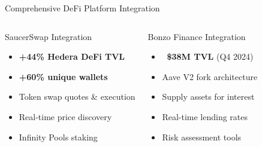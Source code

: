 \documentclass[aspectratio=169]{beamer}
\providecommand{\faLayerGroup}{\faCogs}
\providecommand{\faExchange}{\faSync}
\providecommand{\faShield}{\faLock}
\begin{document}
\begin{frame}{Comprehensive DeFi Platform Integration}
\vspace{0.05cm}
\begin{columns}
\begin{block}{SaucerSwap Integration}
\begin{center}
\end{center}
\vspace{0.05cm}
\begin{itemize}
\setlength\itemsep{-0.1em}
\item[\color{secondary}\faCheckCircle] \textbf{+44\% Hedera DeFi TVL}
\item[\color{secondary}\faUsers] \textbf{+60\% unique wallets}
\item[\color{secondary}\faCoins] Token swap quotes \& execution
\item[\color{secondary}\faChartLine] Real-time price discovery
\item[\color{secondary}\faLayerGroup] Infinity Pools staking
\end{itemize}
\end{block}

\begin{block}{Bonzo Finance Integration}
\begin{center}
\end{center}
\vspace{0.05cm}
\begin{itemize}
\setlength\itemsep{-0.1em}
\item[\color{accent}\faCheckCircle] \textbf{~\$38M TVL} (Q4 2024)
\item[\color{accent}\faCogs] Aave V2 fork architecture
\item[\color{accent}\faPercent] Supply assets for interest
\item[\color{accent}\faChartBar] Real-time lending rates
\item[\color{accent}\faShield] Risk assessment tools
\end{itemize}
\end{block}


\end{columns}
\end{frame}
\end{document}
